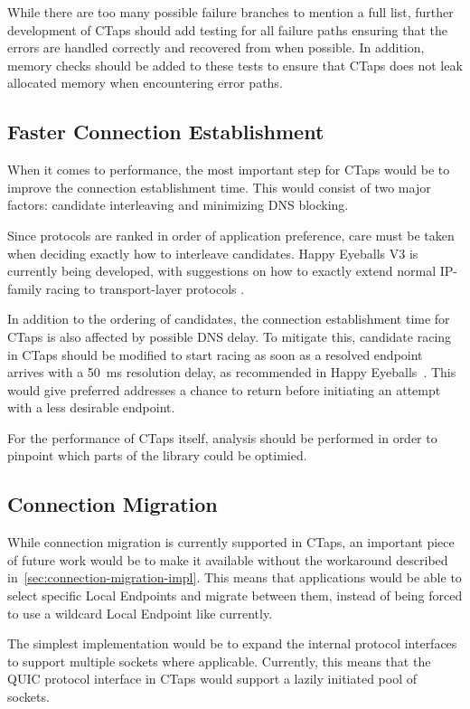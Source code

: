 While there are too many possible failure branches to mention a full list,
further development of CTaps should add testing for
all failure paths ensuring that the errors are handled correctly and recovered
from when possible. In addition, memory checks should be added to these tests
to ensure that CTaps does not leak allocated memory when encountering
error paths.

\subsection{Faster Connection Establishment}
When it comes to performance, the most important step for CTaps would be to
improve the connection establishment time. This would consist of two major
factors: candidate interleaving and minimizing DNS blocking.

Since protocols are ranked in order of application preference,
care must be taken when deciding exactly how to interleave candidates.
Happy Eyeballs V3 is currently being developed, with suggestions on
how to exactly extend normal IP-family racing to transport-layer
protocols \cite[sec.~5]{ietf-happy-happyeyeballs-v3-03}.

In addition to the ordering of candidates, the connection establishment time
for CTaps is also affected by possible DNS delay. To mitigate this, candidate racing in CTaps
should be modified to start racing as soon as a resolved endpoint arrives with a \qty{50}{\milli\second} resolution delay,
as recommended in Happy Eyeballs~\cite[sec.~3]{rfc8305}.
This would give preferred addresses a chance to return before initiating an
attempt with a less desirable endpoint.

For the performance of CTaps itself, analysis should be performed
in order to pinpoint which parts of the library could be optimied.

\subsection{Connection Migration}\label{sec:future-conn-mig}
While connection migration is currently supported in CTaps, an important piece
of future work would be to make it available without the workaround
described in~\cref{sec:connection-migration-impl}. This means that applications
would be able to select specific Local Endpoints and migrate between them, instead
of being forced to use a wildcard Local Endpoint like currently.

The simplest implementation would be to expand the internal protocol interfaces 
to support multiple sockets where applicable. Currently,
this means that the QUIC protocol interface in CTaps would
support a lazily initiated pool of sockets.

